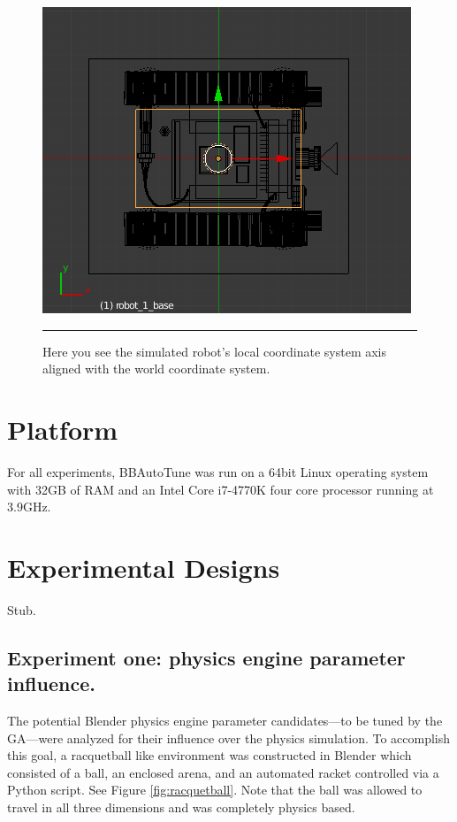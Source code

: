 \begin{figure}[htbp]
\centering
\includegraphics[scale=0.5]{../Figures/Chapter4/simu_robot_aligned.png}
\rule{35em}{0.5pt}
\caption[Simulated Robot Axis Aligned]{Here you see the simulated robot's local coordinate system axis aligned with the world coordinate system.}
\label{fig:simu_robot_aligned}
\end{figure}

\section{Platform}

For all experiments, BBAutoTune was run on a 64bit Linux operating system with 32GB of RAM and an Intel Core i7-4770K four core processor running at 3.9GHz.

\section{Experimental Designs}

Stub.

\subsection[Experiment One]{Experiment one: physics engine parameter influence.}

The potential Blender physics engine parameter candidates---to be tuned by the GA---were analyzed for their influence over the physics simulation. To accomplish this goal, a racquetball like environment was constructed in Blender which consisted of a ball, an enclosed arena, and an automated racket controlled via a Python script. See Figure \ref{fig:racquetball}. Note that the ball was allowed to travel in all three dimensions and was completely physics based.

